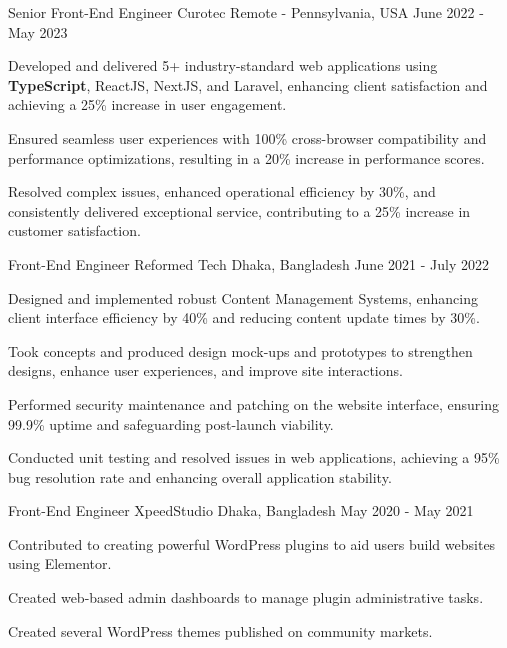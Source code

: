\begin{cventries}
  \cventry
    {Senior Front-End Engineer}
    {Curotec}
    {Remote - Pennsylvania, USA}
    {June 2022 - May 2023}
    {
      \begin{cvitems}
        \item {Developed and delivered 5+ industry-standard web applications using \textbf{TypeScript}, ReactJS, NextJS, and Laravel, enhancing client satisfaction and achieving a 25\% increase in user engagement.}
        \item {Ensured seamless user experiences with 100\% cross-browser compatibility and performance optimizations, resulting in a 20\% increase in performance scores.}
        \item {Resolved complex issues, enhanced operational efficiency by 30\%, and consistently delivered exceptional service, contributing to a 25\% increase in customer satisfaction.}
      \end{cvitems}
    }

  \cventry
    {Front-End Engineer}
    {Reformed Tech}
    {Dhaka, Bangladesh}
    {June 2021 - July 2022}
    {
      \begin{cvitems}
        \item {Designed and implemented robust Content Management Systems, enhancing client interface efficiency by 40\% and reducing content update times by 30\%.}
        \item {Took concepts and produced design mock-ups and prototypes to strengthen designs, enhance user experiences, and improve site interactions.}
        \item {Performed security maintenance and patching on the website interface, ensuring 99.9\% uptime and safeguarding post-launch viability.}
        \item {Conducted unit testing and resolved issues in web applications, achieving a 95\% bug resolution rate and enhancing overall application stability.}
      \end{cvitems}
    }

  \cventry
    {Front-End Engineer}
    {XpeedStudio}
    {Dhaka, Bangladesh}
    {May 2020 - May 2021}
    {
      \begin{cvitems}
        \item {Contributed to creating powerful WordPress plugins to aid users build websites using Elementor.}
        \item {Created web-based admin dashboards to manage plugin administrative tasks.}
        \item {Created several WordPress themes published on community markets.}
      \end{cvitems}
    }

\end{cventries}

